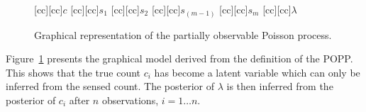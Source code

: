 \begin{figure}[t!]
	\centering
	[cc][cc]{$c$}
	[cc][cc]{$s_{1}$}
	[cc][cc]{$s_{2}$}
	[cc][cc]{$s_{(m-1)}$}
	[cc][cc]{$s_{m}$}
	[cc][cc]{$\lambda$}
%    	
    	
	\caption{Graphical representation of the partially observable Poisson process.}
	\label{fig:gm_popp}
\end{figure}
Figure~\ref{fig:gm_popp} presents the graphical model derived from the definition of the POPP. This shows that the true count $c_i$ has become a latent variable which can only be inferred from the sensed count.
% 
The posterior of $\lambda$ is then inferred from the posterior of $c_i$ after $n$ observations, $i = 1 \ldots n$. 


